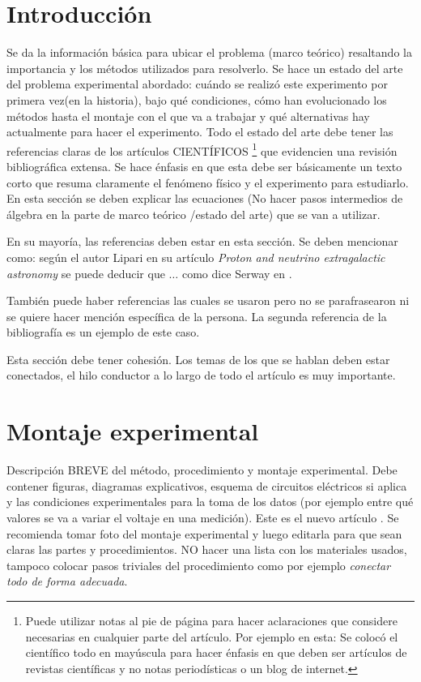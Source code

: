 \documentclass[a4paper, amsfonts, amssymb, amsmath, reprint, showkeys, nofootinbib, twoside]{revtex4-1}
\begin{document}
\section{Introducción}

Se da la información básica para ubicar el problema (marco teórico) resaltando la importancia y los métodos utilizados para resolverlo. Se hace un estado del arte del problema experimental abordado: cuándo se realizó este experimento por primera vez(en la historia), bajo qué condiciones, cómo han evolucionado los métodos hasta el montaje con el que va a trabajar y qué alternativas hay actualmente para hacer el experimento. Todo el estado del arte debe tener las referencias claras de los artículos CIENTÍFICOS \footnote{Puede utilizar notas al pie de página para hacer aclaraciones que considere necesarias en cualquier parte del artículo. Por ejemplo en esta: Se colocó el científico todo en mayúscula para hacer énfasis en que deben ser artículos de revistas científicas y no notas periodísticas o un blog de internet.} que evidencien una revisión bibliográfica extensa. Se hace énfasis en que esta debe ser básicamente un texto corto que resuma claramente el fenómeno físico y el experimento para estudiarlo. En esta  sección se deben explicar las ecuaciones (No hacer pasos intermedios de álgebra en la parte de marco teórico /estado del arte) que se van a utilizar.

En su mayoría, las referencias deben estar en esta sección. Se deben mencionar como: según el autor Lipari \cite{Articulo1} en su artículo \emph{Proton and neutrino extragalactic astronomy} se puede deducir que $\dots$ como dice Serway en \cite{serway2006fisica}.

También puede haber referencias las cuales se usaron pero no se parafrasearon ni se quiere hacer mención específica de la persona. \nocite{Articulo2} La segunda referencia de la bibliografía es un ejemplo de este caso.

Esta sección debe tener cohesión. Los temas de los que se hablan deben estar conectados, el hilo conductor a lo largo de todo el artículo es muy importante.

\section{Montaje experimental}

Descripción BREVE del método, procedimiento y montaje  experimental. Debe contener figuras, diagramas explicativos, esquema de circuitos eléctricos si aplica y las condiciones experimentales para la toma de los datos (por ejemplo entre qué valores se va a variar el voltaje en una medición). Este es el nuevo artículo \cite{Flectcher1994}. Se recomienda tomar foto del montaje experimental y luego editarla para que sean claras las partes y procedimientos. NO hacer una lista con los materiales usados, tampoco colocar pasos triviales del procedimiento como por ejemplo \emph{conectar todo de forma adecuada}.
\end{document}
